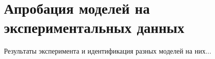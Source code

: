 \section{Апробация моделей на экспериментальных данных}
Результаты эксперимента и идентификация разных моделей на них...